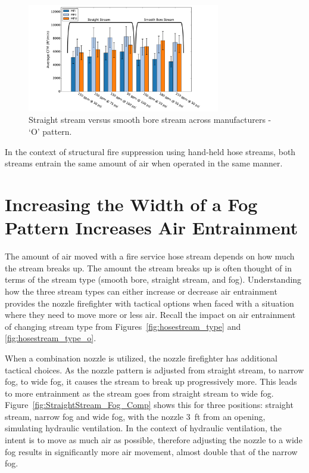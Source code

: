 \documentclass[12pt,oneside]{book}
\begin{document}
\begin{figure}[H]
\centering
\includegraphics[width=0.75\textwidth]{Figures/Air_Entrainment/SB_SS_All_O_Manufacture.pdf}
\caption[Straight Stream vs. Smooth Bore Stream Across Manufacturers - `O' Pattern]{Straight stream versus smooth bore stream across manufacturers - `O' pattern.}
\label{fig:SS_vs_SB_O}
\end{figure}

In the context of structural fire suppression using hand-held hose streams, both streams entrain the same amount of air when operated in the same manner. 

\section{Increasing the Width of a Fog Pattern Increases Air Entrainment}
The amount of air moved with a fire service hose stream depends on how much the stream breaks up. The amount the stream breaks up is often thought of in terms of the stream type (smooth bore, straight stream, and fog). Understanding how the three stream types can either increase or decrease air entrainment provides the nozzle firefighter with tactical options when faced with a situation where they need to move more or less air. Recall the impact on air entrainment of changing stream type from Figures~\ref{fig:hosestream_type} and \ref{fig:hosestream_type_o}.

When a combination nozzle is utilized, the nozzle firefighter has additional tactical choices. As the nozzle pattern is adjusted from straight stream, to narrow fog, to wide fog, it causes the stream to break up progressively more. This leads to more entrainment as the stream goes from straight stream to wide fog. Figure~\ref{fig:StraightStream_Fog_Comp} shows this for three positions: straight stream, narrow fog and wide fog, with the nozzle 3~ft from an opening, simulating hydraulic ventilation. In the context of hydraulic ventilation, the intent is to move as much air as possible, therefore adjusting the nozzle to a wide fog results in significantly more air movement, almost double that of the narrow fog.  
\end{document}
